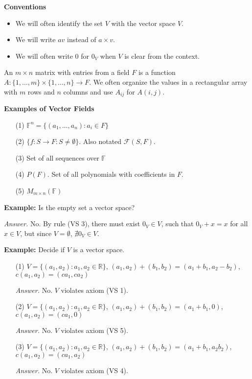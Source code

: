 \documentclass[12pt]{article}
\begin{document}
\textbf{Conventions}

\begin{itemize}
    \item We will often identify the set $V$ with the vector space $V$.
    \item We will write $av$ instead of $a \times v$.
    \item We will often write $0$ for $0_V$ when $V$ is clear from the context.
\end{itemize}

An $m \times n$ matrix with entries from a field $F$ is a function $A : \{1, \dots, m\} \times \{1, \dots, n\} \to F$. We often organize the values in a rectangular array with $m$ rows and $n$ columns and use $A_{ij}$ for $A(i,j)$.

\vspace{1em}

\textbf{Examples of Vector Fields}

\begin{itemize}
    \item[(1)] $\mathbb{F}^n = \{(a_1, \dots, a_n) : a_i \in F\}$
    \item[(2)] $\{f : S \to F : S \neq \emptyset\}$. Also notated $\mathcal{F}(S,F)$.
    \item[(3)] Set of all sequences over $\mathbb{F}$
    \item[(4)] $P(F)$. Set of all polynomials with coefficients in $F$.
    \item[(5)] $M_{m \times n}(\mathbb{F})$
\end{itemize}

\textbf{Example:}
Is the empty set a vector space?

\textit{Answer.} No. By rule (VS 3), there must exist $0_V \in V$, such that $0_V + x = x$ for all $x \in V$, but since $V = \emptyset$, $\nexists 0_V \in V$.

\vspace{1em}

\textbf{Example:}
Decide if $V$ is a vector space.

\begin{itemize}
    \item[(1)] $V = \{(a_1,a_2) : a_1,a_2 \in \mathbb{R}\}$, $(a_1,a_2) + (b_1,b_2) = (a_1 + b_1, a_2 - b_2)$, $c(a_1,a_2) = (ca_1,ca_2)$
    
    \textit{Answer.} No. $V$ violates axiom (VS 1).
    \item[(2)]$V = \{(a_1,a_2) : a_1,a_2 \in \mathbb{R}\}$, $(a_1,a_2) + (b_1,b_2) = (a_1 + b_1, 0)$, $c(a_1,a_2) = (ca_1,0)$
    
    \textit{Answer.} No. $V$ violates axiom (VS 5).
    
    \item[(3)]$V = \{(a_1,a_2) : a_1,a_2 \in \mathbb{R}\}$, $(a_1,a_2) + (b_1,b_2) = (a_1 + b_1, a_2b_2)$, $c(a_1,a_2) = (ca_1,a_2)$
    
    \textit{Answer.} No. $V$ violates axiom (VS 4).
\end{itemize}
\end{document}
